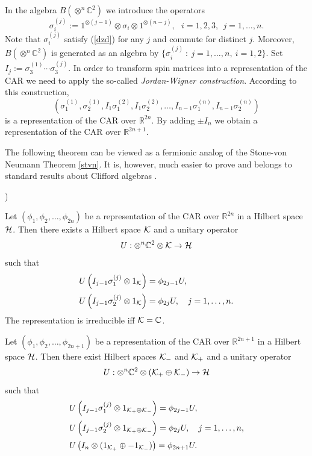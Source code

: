\documentclass{svmult}
\newcounter{smallarabics}
\newenvironment{arabicenumerate}
{\begin{list}{{\normalfont\textrm{\arabic{smallarabics})}}}
  {\usecounter{smallarabics}\setlength{\itemindent}{0cm}
   \setlength{\leftmargin}{5ex}\setlength{\labelwidth}{4ex}
   \setlength{\topsep}{0.75\parsep}\setlength{\partopsep}{0ex}
   \setlength{\itemsep}{0ex}}}
{\end{list}}
\newcommand{\ben}{\begin{arabicenumerate}}
\newcommand{\een}{\end{arabicenumerate}}
\def\bet{\begin{theorem}}
\def\eet{\end{theorem}}
\def\rr{{\mathbb R}}
\def\cc{{\mathbb C}}
\def\cH{{\cal H}}
\def\cK{{\cal K}}
\def\cH{{\cal H}}
\begin{document}
In the algebra $B(\otimes^n\cc^2)$ we introduce the
operators
\[\sigma_i^{(j)}:=1^{\otimes(j-1)}\otimes\sigma_i\otimes1^{\otimes(n-j)},\
\ \
i=1,2,3,\ \ j=1,\dots,n.\]
Note that
 $\sigma_i^{(j)}$ satisfy (\ref{dzd}) for any $j$ and commute for distinct
$j$.
Moreover, $B(\otimes^n\cc^2)$ is generated as an algebra
 by $\{\sigma_i^{(j)}\ :\
j=1,\dots, n,\ i=1,2\}$.
Set $I_j:=\sigma_3^{(1)}\cdots\sigma_3^{(j)}$.
In order to  transform spin matrices into a representation of the CAR we need
to apply the so-called {\em Jordan-Wigner construction}. According to this
construction,
\[\left(\sigma_1^{(1)},\sigma_2^{(1)},I_1\sigma_1^{(2)},I_1\sigma_2^{(2)},\dots,
I_{n-1}\sigma_1^{(n)},I_{n-1}\sigma_2^{(n)}\right)\]
is a representation of the CAR over $\rr^{2n}$. By adding $\pm I_n$ we obtain 
 a representation of the CAR over $\rr^{2n+1}$. 

The  following theorem can be viewed as a fermionic analog of the Stone-von
Neumann Theorem \ref{stvn}.
 It is, however, much easier to prove and belongs to standard results 
 about Clifford algebras \cite{Lo}.





\bet \ben\item
Let $(\phi_1,\phi_2,\dots,\phi_{2n})$ be a representation of the 
CAR over $\rr^{2n}$ in a
Hilbert space $\cH$. Then there exists a Hilbert space $\cK$ and a
unitary operator \[U:\otimes^n\cc^{2}\otimes\cK\to \cH\] 
such that
\[\begin{array}{l}
U\left(I_{j-1}\sigma_1^{(j)}\otimes 1_{\cK}\right) =\phi_{2j-1}U,\\[3mm]
U\left(I_{j-1}\sigma_2^{(j)}\otimes 1_{\cK} \right)=\phi_{2j}U,\ \ \
j=1,\dots,n. 
\end{array}\]
The representation is irreducible iff $\cK=\cc$.
\item Let $(\phi_1,\phi_2,\dots,\phi_{2n+1})$ be a representation of the CAR over $\rr^{2n+1}$ in a
Hilbert space $\cH$. Then there exist Hilbert spaces $\cK_-$ and
$\cK_+$ and a
unitary operator
\[U:\otimes^n\cc^{2}\otimes(\cK_+\oplus\cK_-)
\to \cH\]
such that
\[\begin{array}{l}
U\left(I_{j-1}\sigma_1^{(j)}\otimes 1_{\cK_+\oplus\cK_-}\right) =\phi_{2j-1}U,\\[3mm]
U\left(
I_{j-1}\sigma_2^{(j)}\otimes 1_{\cK_+\oplus\cK_-}\right) =\phi_{2j}U,
\ \ \
j=1,\dots,n,\\[3mm]
U\left(I_n\otimes(1_{\cK_+}\oplus-1_{\cK_-})\right)
=\phi_{2n+1}U.
\end{array}\]\een
\eet
\end{document}
